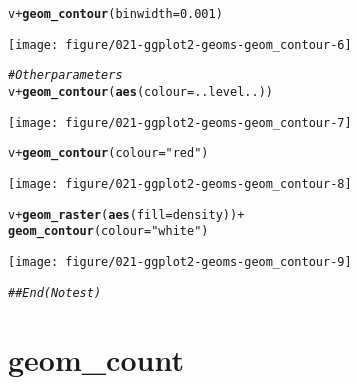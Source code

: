 \documentclass[a4paper,titlepage]{tufte-handout}\usepackage[]{graphicx}\usepackage[]{color}
\makeatletter
\def\maxwidth{ %
  \ifdim\Gin@nat@width>\linewidth
    \linewidth
  \else
    \Gin@nat@width
  \fi
}
\newcommand{\hlnum}[1]{\textcolor[rgb]{0.686,0.059,0.569}{#1}}%
\newcommand{\hlstr}[1]{\textcolor[rgb]{0.192,0.494,0.8}{#1}}%
\newcommand{\hlcom}[1]{\textcolor[rgb]{0.678,0.584,0.686}{\textit{#1}}}%
\newcommand{\hlopt}[1]{\textcolor[rgb]{0,0,0}{#1}}%
\newcommand{\hlstd}[1]{\textcolor[rgb]{0.345,0.345,0.345}{#1}}%
\newcommand{\hlkwc}[1]{\textcolor[rgb]{0.333,0.667,0.333}{#1}}%
\newcommand{\hlkwd}[1]{\textcolor[rgb]{0.737,0.353,0.396}{\textbf{#1}}}%
\newenvironment{kframe}{%
 \def\at@end@of@kframe{}%
 \ifinner\ifhmode%
  \def\at@end@of@kframe{\end{minipage}}%
  \begin{minipage}{\columnwidth}%
 \fi\fi%
 \def\FrameCommand##1{\hskip\@totalleftmargin \hskip-\fboxsep
 \colorbox{shadecolor}{##1}\hskip-\fboxsep
     \hskip-\linewidth \hskip-\@totalleftmargin \hskip\columnwidth}%
 \MakeFramed {\advance\hsize-\width
   \@totalleftmargin\z@ \linewidth\hsize
   \@setminipage}}%
 {\par\unskip\endMakeFramed%
 \at@end@of@kframe}
\newenvironment{knitrout}{}{} %
\makeatother
\begin{document}
\begin{knitrout}
\begin{kframe}\begin{alltt}
\hlstd{v} \hlopt{+} \hlkwd{geom_contour}\hlstd{(}\hlkwc{binwidth} \hlstd{=} \hlnum{0.001}\hlstd{)}
\end{alltt}
\end{kframe}
\texttt{[image: figure/021-ggplot2-geoms-geom\_contour-6]} 
\begin{kframe}\begin{alltt}
\hlcom{# Other parameters}
\hlstd{v} \hlopt{+} \hlkwd{geom_contour}\hlstd{(}\hlkwd{aes}\hlstd{(}\hlkwc{colour} \hlstd{= ..level..))}
\end{alltt}
\end{kframe}
\texttt{[image: figure/021-ggplot2-geoms-geom\_contour-7]} 
\begin{kframe}\begin{alltt}
\hlstd{v} \hlopt{+} \hlkwd{geom_contour}\hlstd{(}\hlkwc{colour} \hlstd{=} \hlstr{"red"}\hlstd{)}
\end{alltt}
\end{kframe}
\texttt{[image: figure/021-ggplot2-geoms-geom\_contour-8]} 
\begin{kframe}\begin{alltt}
\hlstd{v} \hlopt{+} \hlkwd{geom_raster}\hlstd{(}\hlkwd{aes}\hlstd{(}\hlkwc{fill} \hlstd{= density))} \hlopt{+}
  \hlkwd{geom_contour}\hlstd{(}\hlkwc{colour} \hlstd{=} \hlstr{"white"}\hlstd{)}
\end{alltt}
\end{kframe}
\texttt{[image: figure/021-ggplot2-geoms-geom\_contour-9]} 
\begin{kframe}\begin{alltt}
\hlcom{## End(No test)}
\end{alltt}
\end{kframe}
\end{knitrout}


\section{geom\_count}
\end{document}

